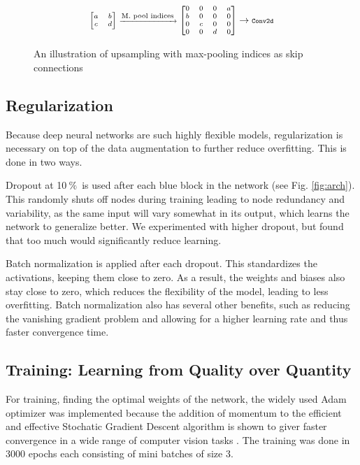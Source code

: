 \documentclass{article}
\newcommand{\pro}{\ensuremath{\ \%}}
\begin{document}
\begin{figure}[h]
	\caption{An illustration of upsampling with max-pooling indices as skip connections}
\begin{equation*}\label{key}
\scriptsize
\begin{bmatrix}a&b\\c&d\end{bmatrix} \xrightarrow{\text{\scriptsize M. pool indices}}
\begin{bmatrix}0&0&0&a\\b&0&0&0\\0&c&0&0\\0&0&d&0\end{bmatrix} 
\rightarrow 
\texttt{\scriptsize Conv2d}
\end{equation*}
\end{figure}
\subsection{Regularization}
Because deep neural networks are such highly flexible models, regularization is necessary on top of the data augmentation to further reduce overfitting.
This is done in two ways.

Dropout at 10\pro\ is used after each blue block in the network (see Fig. \ref{fig:arch}).
This randomly shuts off nodes during training leading to node redundancy and variability, as the same input will vary somewhat in its output, which learns the network to generalize better.
We experimented with higher dropout, but found that too much would significantly reduce learning.

Batch normalization is applied after each dropout.
This standardizes the activations, keeping them close to zero.
As a result, the weights and biases also stay close to zero, which reduces the flexibility of the model, leading to less overfitting.
Batch normalization also has several other benefits, such as reducing the vanishing gradient problem and allowing for a higher learning rate and thus faster convergence time. \cite{bn}

\subsection{Training: Learning from Quality over Quantity}
For training, finding the optimal weights of the network, the widely used Adam optimizer  was implemented because the addition of momentum to the efficient and effective Stochatic Gradient Descent algorithm is shown to giver faster convergence in a wide range of computer vision tasks \cite{Adam}. The training was done in 3000 epochs each consisting of mini batches of size 3.
\end{document}
